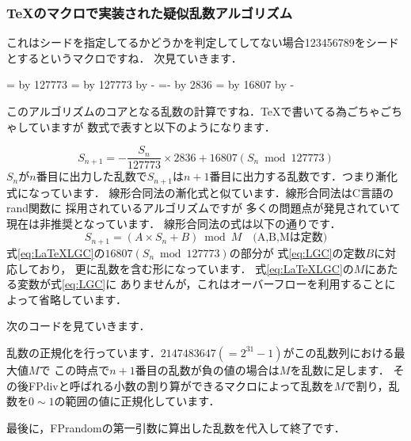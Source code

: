 \subsubsection{\TeX のマクロで実装された疑似乱数アルゴリズム}
\begin{texcode}
\ifnum{}%
\else%
\fi%
\end{texcode}
これはシードを指定してるかどうかを判定してしてない場合123456789をシードとするというマクロですね．
次見ていきます．
\begin{texcode}
\FP@xia=\FPseed%
\divide\FP@xia by 127773%
\FP@xib=\FP@xia%
\multiply\FP@xib by 127773%
\advance\FP@xib by -\FPseed%
\FP@xib=-\FP@xib%
\multiply\FP@xia by 2836%
\FPseed=\FP@xib%
\multiply\FPseed by 16807%
\advance\FPseed by -\FP@xia%
\end{texcode}
このアルゴリズムのコアとなる乱数の計算ですね．\TeX で書いてる為ごちゃごちゃしていますが
数式で表すと以下のようになります．

\begin{equation}\label{eq:LaTeXLGC}
S_{n+1} = - \frac{S_n}{127773}\times 2836 + 16807(S_n \bmod 127773)
\end{equation}
$S_n$が$n$番目に出力した乱数で$S_{n+1}$は$n+1$番目に出力する乱数です．つまり漸化式になっています．
線形合同法の漸化式と似ています．線形合同法はC言語のrand関数に
採用されているアルゴリズムですが
多くの問題点が発見されていて現在は非推奨となっています．
線形合同法の式は以下の通りです．
\begin{equation}\label{eq:LGC}
S_{n+1}=(A\times S_n + B) \bmod M \quad \textrm{(A,B,Mは定数)}
\end{equation}
式\eqref{eq:LaTeXLGC}の$16807(S_n \bmod 127773)$の部分が
式\eqref{eq:LGC}の定数$B$に対応しており，
更に乱数を含む形になっています．
式\eqref{eq:LaTeXLGC}の$M$にあたる変数が式\eqref{eq:LGC}に
ありませんが，これはオーバーフローを利用することによって省略しています．

次のコードを見ていきます．
乱数の正規化を行っています．$2147483647(=2^{31}-1)$がこの乱数列における最大値$M$で
この時点で$n+1$番目の乱数が負の値の場合は$M$を乱数に足します．
その後FPdivと呼ばれる小数の割り算ができるマクロによって乱数を$M$で割り，乱数を$0\sim 1$の範囲の値に正規化しています．
最後に，FPrandomの第一引数に算出した乱数を代入して終了です．
